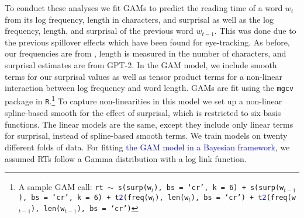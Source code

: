 \documentclass[12pt]{article}
\newcommand{\change}[1]{\textcolor{blue}{#1}}
\begin{document}
{To conduct these analyses we fit GAMs to predict the reading time of a word $w_t$ from its log frequency, length in characters, and surprisal as well as the log frequency, length, and surprisal of the previous word $w_{t-1}$. This was done due to the previous spillover effects which have been found for eye-tracking. As before, our frequencies are from \citet{speer2022wordfreq}, length is measured in the number of characters, and surprisal estimates are from GPT-2. In the GAM model, we include smooth terms for our surprisal values as well as tensor product terms for a non-linear interaction between log frequency and word length. GAMs are fit using the \texttt{mgcv} package in \texttt{R}.\footnote{A sample GAM call: \texttt{rt $\sim$ s(surp(w$_t$), bs = `cr', k = 6) + s(surp(w$_{t-1}$), bs = `cr', k = 6) + t\change{2}(freq(w$_t$), len(w$_t$), bs = `cr') + t\change{2}(freq(w$_{t-1}$), len(w$_{t-1}$), bs = `cr')}} To capture non-linearities in this model we set up a non-linear spline-based smooth for the effect of surprisal, which is restricted to six basis functions. The linear models are the same, except they include only linear terms for surprisal, instead of spline-based smooth terms.
We train models on twenty different folds of data. %
For fitting \change{the GAM model in a Bayesian framework}, we assumed RTs follow a Gamma distribution with a log link function.%
}
\end{document}
